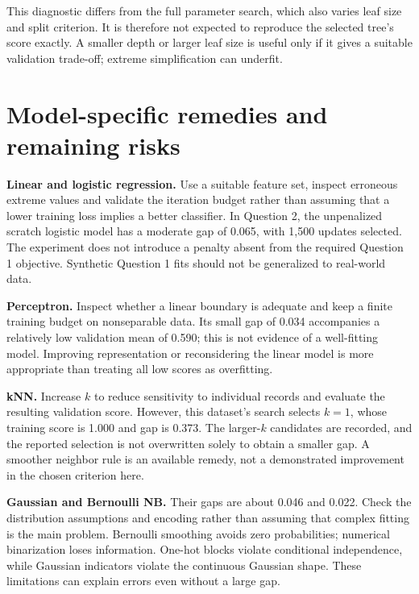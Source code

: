 This diagnostic differs from the full parameter search, which also varies leaf size and split criterion. It is therefore not expected to reproduce the selected tree's score exactly. A smaller depth or larger leaf size is useful only if it gives a suitable validation trade-off; extreme simplification can underfit.


\section{Model-specific remedies and remaining risks}
\textbf{Linear and logistic regression.} Use a suitable feature set, inspect erroneous extreme values and validate the iteration budget rather than assuming that a lower training loss implies a better classifier. In Question 2, the unpenalized scratch logistic model has a moderate gap of 0.065, with 1,500 updates selected. The experiment does not introduce a penalty absent from the required Question 1 objective. Synthetic Question 1 fits should not be generalized to real-world data.

\textbf{Perceptron.} Inspect whether a linear boundary is adequate and keep a finite training budget on nonseparable data. Its small gap of 0.034 accompanies a relatively low validation mean of 0.590; this is not evidence of a well-fitting model. Improving representation or reconsidering the linear model is more appropriate than treating all low scores as overfitting.

\textbf{kNN.} Increase $k$ to reduce sensitivity to individual records and evaluate the resulting validation score. However, this dataset's search selects $k=1$, whose training score is 1.000 and gap is 0.373. The larger-$k$ candidates are recorded, and the reported selection is not overwritten solely to obtain a smaller gap. A smoother neighbor rule is an available remedy, not a demonstrated improvement in the chosen criterion here.

\textbf{Gaussian and Bernoulli NB.} Their gaps are about 0.046 and 0.022. Check the distribution assumptions and encoding rather than assuming that complex fitting is the main problem. Bernoulli smoothing avoids zero probabilities; numerical binarization loses information. One-hot blocks violate conditional independence, while Gaussian indicators violate the continuous Gaussian shape. These limitations can explain errors even without a large gap.

